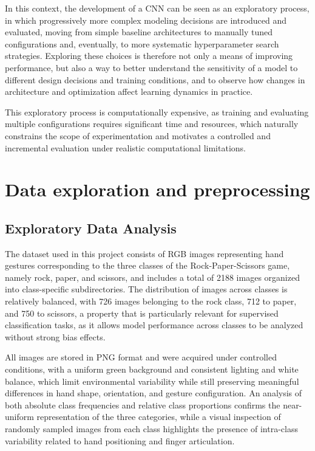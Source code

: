 \documentclass[11pt,a4paper]{article}
\begin{document}
In this context, the development of a CNN can be seen as an exploratory process, in which progressively more complex modeling decisions are introduced and evaluated, moving from simple baseline architectures to manually tuned configurations and, eventually, to more systematic hyperparameter search strategies.
Exploring these choices is therefore not only a means of improving performance, but also a way to better understand the sensitivity of a model to different design decisions and training conditions, and to observe how changes in architecture and optimization affect learning dynamics in practice.

This exploratory process is computationally expensive, as training and evaluating multiple configurations requires significant time and resources, which naturally constrains the scope of experimentation and motivates a controlled and incremental evaluation under realistic computational limitations.

\section{Data exploration and preprocessing}

\subsection{Exploratory Data Analysis}
The dataset \cite{rockpaperscissors_kaggle} used in this project consists of RGB images representing hand gestures corresponding to the three classes of the Rock-Paper-Scissors game, namely rock, paper, and scissors, and includes a total of 2188 images organized into class-specific subdirectories.
The distribution of images across classes is relatively balanced, with 726 images belonging to the rock class, 712 to paper, and 750 to scissors, a property that is particularly relevant for supervised classification tasks, as it allows model performance across classes to be analyzed without strong bias effects.

All images are stored in PNG format and were acquired under controlled conditions, with a uniform green background and consistent lighting and white balance, which limit environmental variability while still preserving meaningful differences in hand shape, orientation, and gesture configuration.
An analysis of both absolute class frequencies and relative class proportions confirms the near-uniform representation of the three categories, while a visual inspection of randomly sampled images from each class highlights the presence of intra-class variability related to hand positioning and finger articulation.
\end{document}
